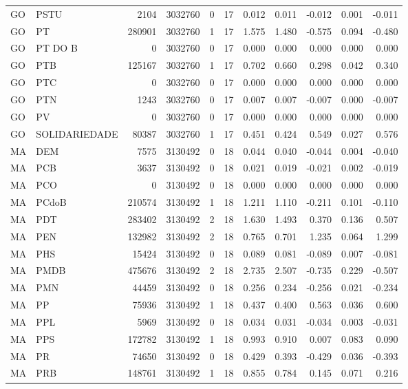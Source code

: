 \begin{landscape}
\begin{longtable}{llrrrrrrrrr}
GO & PSTU & 2104 & 3032760 & 0 & 17 & 0.012 & 0.011 & -0.012 & 0.001 & -0.011 \\
GO & PT & 280901 & 3032760 & 1 & 17 & 1.575 & 1.480 & -0.575 & 0.094 & -0.480 \\
GO & PT DO B & 0 & 3032760 & 0 & 17 & 0.000 & 0.000 & 0.000 & 0.000 & 0.000 \\
GO & PTB & 125167 & 3032760 & 1 & 17 & 0.702 & 0.660 & 0.298 & 0.042 & 0.340 \\
GO & PTC & 0 & 3032760 & 0 & 17 & 0.000 & 0.000 & 0.000 & 0.000 & 0.000 \\
GO & PTN & 1243 & 3032760 & 0 & 17 & 0.007 & 0.007 & -0.007 & 0.000 & -0.007 \\
GO & PV & 0 & 3032760 & 0 & 17 & 0.000 & 0.000 & 0.000 & 0.000 & 0.000 \\
GO & SOLIDARIEDADE & 80387 & 3032760 & 1 & 17 & 0.451 & 0.424 & 0.549 & 0.027 & 0.576 \\
MA & DEM & 7575 & 3130492 & 0 & 18 & 0.044 & 0.040 & -0.044 & 0.004 & -0.040 \\
MA & PCB & 3637 & 3130492 & 0 & 18 & 0.021 & 0.019 & -0.021 & 0.002 & -0.019 \\
MA & PCO & 0 & 3130492 & 0 & 18 & 0.000 & 0.000 & 0.000 & 0.000 & 0.000 \\
MA & PCdoB & 210574 & 3130492 & 1 & 18 & 1.211 & 1.110 & -0.211 & 0.101 & -0.110 \\
MA & PDT & 283402 & 3130492 & 2 & 18 & 1.630 & 1.493 & 0.370 & 0.136 & 0.507 \\
MA & PEN & 132982 & 3130492 & 2 & 18 & 0.765 & 0.701 & 1.235 & 0.064 & 1.299 \\
MA & PHS & 15424 & 3130492 & 0 & 18 & 0.089 & 0.081 & -0.089 & 0.007 & -0.081 \\
MA & PMDB & 475676 & 3130492 & 2 & 18 & 2.735 & 2.507 & -0.735 & 0.229 & -0.507 \\
MA & PMN & 44459 & 3130492 & 0 & 18 & 0.256 & 0.234 & -0.256 & 0.021 & -0.234 \\
MA & PP & 75936 & 3130492 & 1 & 18 & 0.437 & 0.400 & 0.563 & 0.036 & 0.600 \\
MA & PPL & 5969 & 3130492 & 0 & 18 & 0.034 & 0.031 & -0.034 & 0.003 & -0.031 \\
MA & PPS & 172782 & 3130492 & 1 & 18 & 0.993 & 0.910 & 0.007 & 0.083 & 0.090 \\
MA & PR & 74650 & 3130492 & 0 & 18 & 0.429 & 0.393 & -0.429 & 0.036 & -0.393 \\
MA & PRB & 148761 & 3130492 & 1 & 18 & 0.855 & 0.784 & 0.145 & 0.071 & 0.216 \\

\end{longtable}
\end{landscape}
